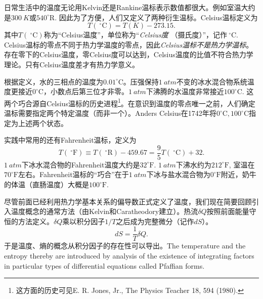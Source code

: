 日常生活中的温度无论用Kelvin还是Rankine温标表示数值都很大。例如室温大约是$\SI{300}{K}$或$540^\circ\mathrm{R}$. 因此为了方便，人们又定义了两种衍生温标。Celsius温标定义为
\begin{equation}
\label{equ2.43}
	T(\ ^\circ \mathrm{C}) = T(K) - 273.15.
\end{equation}
其中$T(\ ^\circ \mathrm{C})$称为“Celsius温度”，单位称为“{\it Celsius度} （摄氏度）”，记作$\ ^\circ \mathrm{C}$. Celsius温标的零点不同于热力学温度的零点，因此{\it Celsius温标不是热力学温标}。存在零下的Celsius温度，零Celsius度可以达到，Celsius温度的比值不符合热力学理论。只有Celsius温度差才有热力学意义。

根据定义，水的三相点的温度为$0.01^\circ \mathrm{C}$。压强保持$\SI{1}{atm}$不变的冰水混合物系统温度更接近$0^\circ \mathrm{C}$，小数点后第三位才非零。$\SI{1}{atm}$下沸腾的水温度非常接近$100^\circ \mathrm{C}$. 这两个巧合源自Celsius温标的历史进程\footnote{这方面的历史可见E. R. Jones, Jr., The Physics Teacher 18, 594 (1980). }。在意识到温度的零点唯一之前，人们确定温标需要指定两个特定温度（而非一个）。Anders Celsius在1742年将$0^\circ \mathrm{C}, 100^\circ \mathrm{C}$指定为上述两个状态。

实践中常用的还有Fahrenheit温标，定义为
\begin{equation}
\label{equ2.44}
	T(\ ^\circ \mathrm{F}) \equiv T(\ ^\circ\mathrm{R}) - 459.67 = \frac{9}{5} T(\ ^\circ \mathrm{C}) + 32.
\end{equation}
$\SI{1}{atm}$下冰水混合物的Fahrenheit温度大约是$32^\circ\mathrm{F}$. $\SI{1}{atm}$下沸水约为$212^\circ\mathrm{F}$, 室温在$70^\circ\mathrm{F}$左右。Fahrenheit温标的“巧合”在于$\SI{1}{atm}$下冰与盐水混合物为$0^\circ \mathrm{F}$附近，奶牛的体温（直肠温度）大概是$100^\circ \mathrm{F}$.

尽管前面已经利用热力学基本关系的偏导数正式定义了温度，我们现在简要回顾引入温度概念的通常方法（由Kelvin和Caratheodory建立）。热流$\delta Q$按照前面能量守恒的方法定义。$\delta Q$乘以积分因子$1 / T$之后成为完整微分（记作$dS$）。
\begin{equation}
\label{equ2.45}
	dS = \frac{1}{T} \delta Q.
\end{equation}
于是温度、熵的概念从积分因子的存在性可以导出。The temperature and the entropy thereby are introduced by analysis of the existence of integrating factors in particular types of differential equations called Pfaffian forms. 




